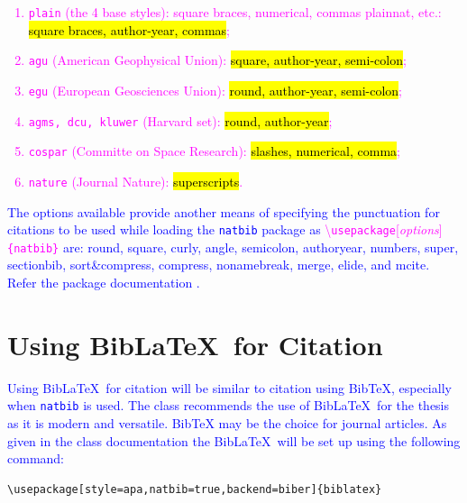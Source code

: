 \documentclass[phd]{ndsu-thesis-2022}
\newcommand\italk[1]{\textcolor{blue}{#1}}  %
\newcommand\cmd[1]{\textbackslash\texttt{#1}}  %
\newcommand\vb[1]{\textcolor{blue}{\texttt{#1}}}%
\begin{document}
\vspace{-6ex}
\textcolor{magenta}{
\begin{enumerate}
\item \texttt{plain} (the 4 base styles): square braces, numerical, commas plainnat, etc.: \hl{square braces, author-year, commas};
\item \texttt{agu} (American Geophysical Union): \hl{square, author-year, semi-colon};
\item \texttt{egu} (European Geosciences Union): \hl{round, author-year, semi-colon};
\item \texttt{agms, dcu, kluwer} (Harvard set): \hl{round, author-year};
\item \texttt{cospar} (Committe on Space Research): \hl{slashes, numerical, comma};
\item \texttt{nature} (Journal Nature): \hl{superscripts}.
\end{enumerate}
}

\italk{
The options available provide another means of specifying the punctuation
for citations to be used while loading the \texttt{natbib} package as \textcolor{magenta}{\cmd{usepackage}[\emph{options}]\texttt{\{natbib\}}} are: \textbullet\:round, \textbullet\:square, \textbullet\:curly, \textbullet\:angle, \textbullet\:semicolon, \textbullet\:authoryear, \textbullet\:numbers, \textbullet\:super, \textbullet\:sectionbib, \textbullet\:sort\&compress, \textbullet\:compress, \textbullet\:nonamebreak, \textbullet\:merge, \textbullet\:elide, and \textbullet\:mcite. Refer the package documentation \citep{daly2010natural}.  
}

\section{Using Bib\LaTeX\ for Citation}
\italk{Using Bib\LaTeX\ for citation will be similar to citation using BibTeX, especially when \vb{natbib} is used. The class recommends the use of Bib\LaTeX\ for the thesis as it is modern and versatile.  BibTeX may be the choice for journal articles. As given in the class documentation the Bib\LaTeX\ will be set up using the following command:
}

\vspace{2ex}
{\singlespacing
\begin{verbatim}
\usepackage[style=apa,natbib=true,backend=biber]{biblatex}
\end{verbatim}
}
\end{document}
